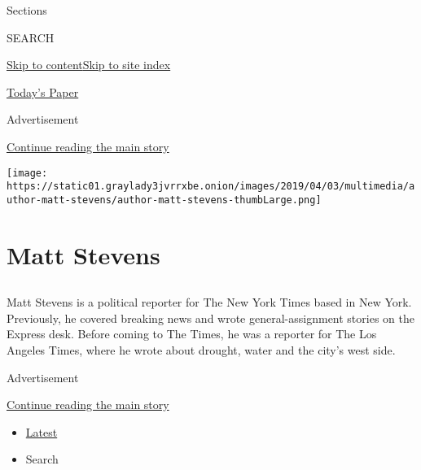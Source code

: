 Sections

SEARCH

\protect\hyperlink{site-content}{Skip to
content}\protect\hyperlink{site-index}{Skip to site index}

\href{https://myaccount.nytimes3xbfgragh.onion/auth/login?response_type=cookie\&client_id=vi}{}

\href{https://www.nytimes3xbfgragh.onion/section/todayspaper}{Today's
Paper}

Advertisement

\protect\hyperlink{after-top}{Continue reading the main story}

\texttt{[image: https://static01.graylady3jvrrxbe.onion/images/2019/04/03/multimedia/author-matt-stevens/author-matt-stevens-thumbLarge.png]}

\hypertarget{matt-stevens}{%
\section{Matt Stevens}\label{matt-stevens}}

\subsection{}

Matt Stevens is a political reporter for The New York Times based in New
York. Previously, he covered breaking news and wrote general-assignment
stories on the Express desk. Before coming to The Times, he was a
reporter for The Los Angeles Times, where he wrote about drought, water
and the city's west side.

Advertisement

\protect\hyperlink{after-mid1}{Continue reading the main story}

\begin{itemize}
\tightlist
\item
  \protect\hyperlink{stream-panel}{Latest}
\item
  Search
\end{itemize}

